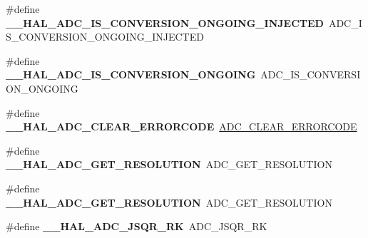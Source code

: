 \begin{DoxyCompactItemize}
\item 
\hypertarget{group___h_a_l___a_d_c___aliased___macros_ga085a3824fd83a50c46bcc8edaf0f986d}{\#define {\bfseries \-\_\-\-\_\-\-H\-A\-L\-\_\-\-A\-D\-C\-\_\-\-I\-S\-\_\-\-C\-O\-N\-V\-E\-R\-S\-I\-O\-N\-\_\-\-O\-N\-G\-O\-I\-N\-G\-\_\-\-I\-N\-J\-E\-C\-T\-E\-D}~A\-D\-C\-\_\-\-I\-S\-\_\-\-C\-O\-N\-V\-E\-R\-S\-I\-O\-N\-\_\-\-O\-N\-G\-O\-I\-N\-G\-\_\-\-I\-N\-J\-E\-C\-T\-E\-D}\label{group___h_a_l___a_d_c___aliased___macros_ga085a3824fd83a50c46bcc8edaf0f986d}

\item 
\hypertarget{group___h_a_l___a_d_c___aliased___macros_ga64acf0d02a8ef5df5644c4232cef1fca}{\#define {\bfseries \-\_\-\-\_\-\-H\-A\-L\-\_\-\-A\-D\-C\-\_\-\-I\-S\-\_\-\-C\-O\-N\-V\-E\-R\-S\-I\-O\-N\-\_\-\-O\-N\-G\-O\-I\-N\-G}~A\-D\-C\-\_\-\-I\-S\-\_\-\-C\-O\-N\-V\-E\-R\-S\-I\-O\-N\-\_\-\-O\-N\-G\-O\-I\-N\-G}\label{group___h_a_l___a_d_c___aliased___macros_ga64acf0d02a8ef5df5644c4232cef1fca}

\item 
\hypertarget{group___h_a_l___a_d_c___aliased___macros_ga18c93f7ab9df4bb73371bbe50a131d6d}{\#define {\bfseries \-\_\-\-\_\-\-H\-A\-L\-\_\-\-A\-D\-C\-\_\-\-C\-L\-E\-A\-R\-\_\-\-E\-R\-R\-O\-R\-C\-O\-D\-E}~\hyperlink{group___a_d_c___private___macros_gac7ab87a3ab932eed1b3ac5faad4e3aa9}{A\-D\-C\-\_\-\-C\-L\-E\-A\-R\-\_\-\-E\-R\-R\-O\-R\-C\-O\-D\-E}}\label{group___h_a_l___a_d_c___aliased___macros_ga18c93f7ab9df4bb73371bbe50a131d6d}

\item 
\hypertarget{group___h_a_l___a_d_c___aliased___macros_gaadc60b61ddd4d5572f3a4c6dbc0520a6}{\#define {\bfseries \-\_\-\-\_\-\-H\-A\-L\-\_\-\-A\-D\-C\-\_\-\-G\-E\-T\-\_\-\-R\-E\-S\-O\-L\-U\-T\-I\-O\-N}~A\-D\-C\-\_\-\-G\-E\-T\-\_\-\-R\-E\-S\-O\-L\-U\-T\-I\-O\-N}\label{group___h_a_l___a_d_c___aliased___macros_gaadc60b61ddd4d5572f3a4c6dbc0520a6}

\item 
\hypertarget{group___h_a_l___a_d_c___aliased___macros_gaadc60b61ddd4d5572f3a4c6dbc0520a6}{\#define {\bfseries \-\_\-\-\_\-\-H\-A\-L\-\_\-\-A\-D\-C\-\_\-\-G\-E\-T\-\_\-\-R\-E\-S\-O\-L\-U\-T\-I\-O\-N}~A\-D\-C\-\_\-\-G\-E\-T\-\_\-\-R\-E\-S\-O\-L\-U\-T\-I\-O\-N}\label{group___h_a_l___a_d_c___aliased___macros_gaadc60b61ddd4d5572f3a4c6dbc0520a6}

\item 
\hypertarget{group___h_a_l___a_d_c___aliased___macros_ga3f3d0f19ef64dab8816b7e4d563da42c}{\#define {\bfseries \-\_\-\-\_\-\-H\-A\-L\-\_\-\-A\-D\-C\-\_\-\-J\-S\-Q\-R\-\_\-\-R\-K}~A\-D\-C\-\_\-\-J\-S\-Q\-R\-\_\-\-R\-K}\label{group___h_a_l___a_d_c___aliased___macros_ga3f3d0f19ef64dab8816b7e4d563da42c}


\end{DoxyCompactItemize}
